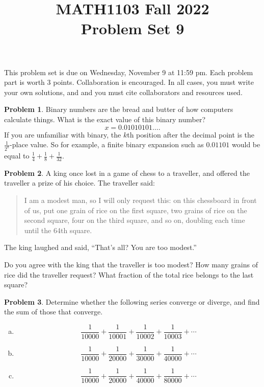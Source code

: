 \documentclass[11pt,oneside]{amsart}
\title{MATH1103 Fall 2022\\
Problem Set 9}
\theoremstyle{definition}
\newtheorem{problem}{Problem}
\theoremstyle{plain}
\begin{document}
\maketitle
This problem set is due on Wednesday, November 9 at 11:59 pm. Each problem part is worth 3 points. Collaboration is encouraged. In all cases, you must write your own solutions, and and you must cite collaborators and resources used.

\begin{problem}
Binary numbers are the bread and butter of how computers calculate things. What is the exact value of this binary number?
\[x=0.01010101\ldots.\]
If you are unfamiliar with binary, the $k$th position after the decimal point is the $\frac 1{2^k}$-place value. So for example, a finite binary expansion such as $0.01101$ would be equal to $\frac 14+\frac 18+\frac 1{32}$.
\end{problem}

\begin{problem}
A king once lost in a game of chess to a traveller, and offered the traveller a prize of his choice. The traveller said:
\begin{quote}
  I am a modest man, so I will only request this: on this chessboard in front of us, put one grain of rice on the first square, two grains of rice on the second square, four on the third square, and so on, doubling each time until the 64th square.
\end{quote}

The king laughed and said, ``That's all? You are too modest.''

Do you agree with the king that the traveller is too modest? How many grains of rice did the traveller request? What fraction of the total rice belongs to the last square?
\end{problem}

\begin{problem}
Determine whether the following series converge or diverge, and find the sum of those that converge.
\begin{enumerate}[(a)]
  \item \[\frac 1{10000}+\frac 1{10001}+\frac 1{10002}+\frac 1{10003}+\cdots\]
  \item \[\frac 1{10000}+\frac 1{20000}+\frac 1{30000}+\frac 1{40000}+\cdots\]
  \item \[\frac 1{10000}+\frac 1{20000}+\frac 1{40000}+\frac 1{80000}+\cdots\]
\end{enumerate}
\end{problem}
\end{document}
